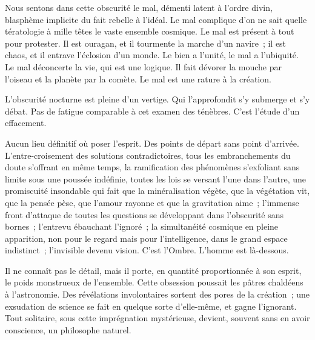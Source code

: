 \documentclass[french,twoside]{book} %
\begin{document}
Nous sentons dans cette obscurité le mal, démenti latent à l’ordre divin, blasphème implicite du fait rebelle à l’idéal. Le mal complique d’on ne sait quelle tératologie à mille têtes le vaste ensemble cosmique. Le mal est présent à tout pour protester. Il est ouragan, et il tourmente la marche d’un navire ; il est chaos, et il entrave l’éclosion d’un monde. Le bien a l’unité, le mal a l’ubiquité. Le mal déconcerte la vie, qui est une logique. Il fait dévorer la mouche par l’oiseau et la planète par la comète. Le mal est une rature à la création.\par
L’obscurité nocturne est pleine d’un vertige. Qui l’approfondit s’y submerge et s’y débat. Pas de fatigue comparable à cet examen des ténèbres. C’est l’étude d’un effacement.\par
Aucun lieu définitif où poser l’esprit. Des points de départ sans point d’arrivée. L’entre-croisement des solutions contradictoires, tous les embranchements du doute s’offrant en même temps, la ramification des phénomènes s’exfoliant sans limite sous une poussée indéfinie, toutes les lois se versant l’une dans l’autre,  une promiscuité insondable qui fait que la minéralisation végète, que la végétation vit, que la pensée pèse, que l’amour rayonne et que la gravitation aime ; l’immense front d’attaque de toutes les questions se développant dans l’obscurité sans bornes ; l’entrevu ébauchant l’ignoré ; la simultanéité cosmique en pleine apparition, non pour le regard mais pour l’intelligence, dans le grand espace indistinct ; l’invisible devenu vision. C’est l’Ombre. L’homme est là-dessous.\par
Il ne connaît pas le détail, mais il porte, en quantité proportionnée à son esprit, le poids monstrueux de l’ensemble. Cette obsession poussait les pâtres chaldéens à l’astronomie. Des révélations involontaires sortent des pores de la création ; une exsudation de science se fait en quelque sorte d’elle-même, et gagne l’ignorant. Tout solitaire, sous cette imprégnation mystérieuse, devient, souvent sans en avoir conscience, un philosophe naturel.\par
\end{document}
